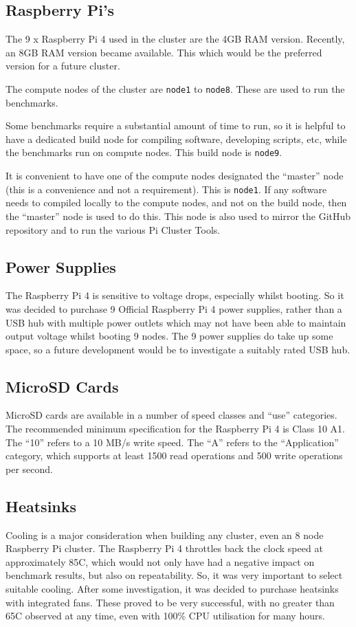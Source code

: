 \documentclass{report}
\begin{document}
%
%
\subsection{Raspberry Pi's}
The 9 x Raspberry Pi 4 used in the cluster are the 4GB RAM version. Recently, an 8GB RAM version became available. This which would be the preferred version for a future cluster.

The compute nodes of the cluster are \verb|node1| to \verb|node8|. These are used to run the benchmarks.  

Some benchmarks require a substantial amount of time to run, so it is helpful to have a dedicated build node for compiling software, developing scripts, etc, while the benchmarks run on compute nodes. This build node is \verb|node9|.

It is convenient to have one of the compute nodes designated the ``master'' node (this is a convenience and not a requirement). This is \verb|node1|. If any software needs to compiled locally to the compute nodes, and not on the build node, then the ``master'' node is used to do this. This node is also used to mirror the GitHub repository and to run the various Pi Cluster Tools. 


%
%
\subsection{Power Supplies}
The Raspberry Pi 4 is sensitive to voltage drops, especially whilst booting. So it was decided to purchase 9 Official Raspberry Pi 4 power supplies, rather than a USB hub with multiple power outlets which may not have been able to maintain output voltage whilst booting 9 nodes. The 9 power supplies do take up some space, so a future development would be to investigate a suitably rated USB hub.


%
%
\subsection{MicroSD Cards}
MicroSD cards are available in a number of speed classes and ``use'' categories. The recommended minimum specification for the Raspberry Pi 4 is Class 10 A1. The ``10'' refers to a 10 MB/s write speed. The ``A'' refers to the ``Application'' category, which supports at least 1500 read operations and 500 write operations per second.


%
%
\subsection{Heatsinks}
Cooling is a major consideration when building any cluster, even an 8 node Raspberry Pi cluster. The Raspberry Pi 4 throttles back the clock speed at approximately 85\degree C, which would not only have had a negative impact on benchmark results, but also on repeatability. So, it was very important to select suitable cooling. After some investigation, it was decided to purchase heatsinks with integrated fans. These proved to be very successful, with no greater than 65\degree C observed at any time, even with 100\% CPU utilisation for many hours. 
\end{document}
